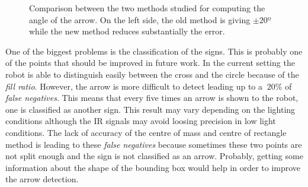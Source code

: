 \begin{figure}[h]
\centering
{}
\caption{Comparison between the two methods studied for computing the angle of the arrow. On the left side, the old method is giving $\pm 20º$ while the new method reduces substantially the error.}
\label{fig:angle}
\end{figure}

One of the biggest problems is the classification of the signs. This is probably one of the points that should be improved in future work. In the current setting the robot is able to distinguish easily between the cross and the circle because of the \textit{fill ratio}. However, the arrow is more difficult to detect leading up to a $~20\%$ of \textit{false negatives}. This means that every five times an arrow is shown to the robot, one is classified as another sign. This result may vary depending on the lighting conditions although the IR signals may avoid loosing precision in low light conditions. The lack of accuracy of the centre of mass and centre of rectangle method is leading to these \textit{false negatives} because sometimes these two points are not split enough and the sign is not classified as an arrow. Probably, getting some information about the shape of the bounding box would help in order to improve the arrow detection.

